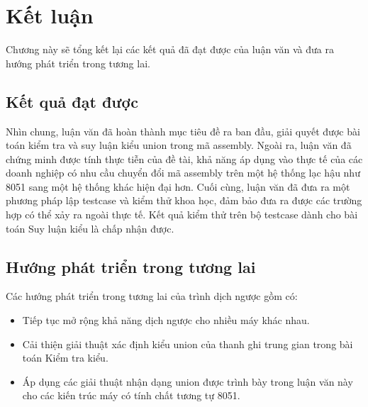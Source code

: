 \chapter{Kết luận}

Chương này sẽ tổng kết lại các kết quả đã đạt được của luận văn và đưa ra hướng phát triển trong tương lai.

\section{Kết quả đạt được}

Nhìn chung, luận văn đã hoàn thành mục tiêu đề ra ban đầu, giải quyết được bài toán kiểm tra và suy luận kiểu union trong mã assembly. Ngoài ra, luận văn đã chứng minh được tính thực tiễn của đề tài, khả năng áp dụng vào thực tế của các doanh nghiệp có nhu cầu chuyển đổi mã assembly trên một hệ thống lạc hậu như 8051 sang một hệ thống khác hiện đại hơn. Cuối cùng, luận văn đã đưa ra một phương pháp lập testcase và kiểm thử khoa học, đảm bảo đưa ra được các trường hợp có thể xảy ra ngoài thực tế. Kết quả kiểm thử trên bộ testcase dành cho bài toán Suy luận kiểu là chấp nhận được.

\section{Hướng phát triển trong tương lai}

Các hướng phát triển trong tương lai của trình dịch ngược gồm có:

\begin{itemize}
	\item Tiếp tục mở rộng khả năng dịch ngược cho nhiều máy khác nhau.
	\item Cải thiện giải thuật xác định kiểu union của thanh ghi trung gian trong bài toán Kiểm tra kiểu.
	\item Áp dụng các giải thuật nhận dạng union được trình bày trong luận văn này cho các kiến trúc máy có tính chất tương tự 8051.
\end{itemize}
